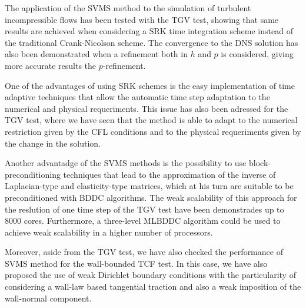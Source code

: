 The application of the SVMS method to the simulation of turbulent incompressible flows has been tested with the TGV test, showing that same results are achieved when considering a SRK time integration scheme instead of the traditional Crank-Nicolson scheme. The convergence to the DNS solution has also been demonstrated when a refinement both in $ h $ and $ p $ is considered, giving more accurate results the $ p $-refinement.

One of the advantages of using SRK schemes is the easy implementation of time adaptive techniques that allow the automatic time step adaptation to the numerical and physical requeriments. This issue has also been adressed for the TGV test, where we have seen that the method is able to adapt to the numerical restriction given by the CFL conditions and to the physical requeriments given by the change in the solution.

Another advantadge of the SVMS methods is the possibility to use block-preconditioning techniques that lead to the approximation of the inverse of Laplacian-type and elasticity-type matrices, which at his turn are suitable to be preconditioned with BDDC algorithms. The weak scalability of this approach for the reslution of one time step of the TGV test have been demonstrades up to 8000 cores. Furthermore, a three-level MLBDDC algorithm could be used to achieve weak scalability in a higher number of processors.

Moreover, aside from the TGV test, we have also checked the performance of SVMS method for the wall-bounded TCF test. In this case, we have also proposed the use of weak Dirichlet boundary conditions with the particularity of considering a wall-law based tangential traction and also a weak imposition of the wall-normal component.